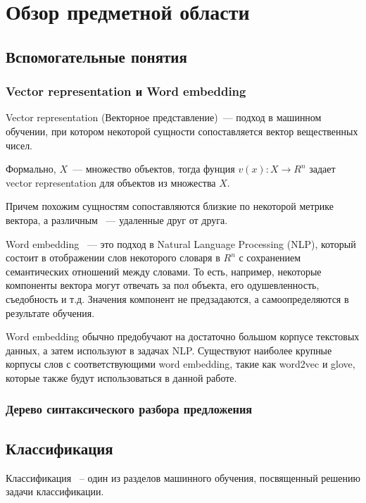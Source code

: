 
\chapter{Обзор предметной области}

\section{Вспомогательные понятия}

\subsection{Vector representation и Word embedding}
Vector representation (Векторное представление)~--- подход в машинном обучении, при котором некоторой сущности
сопоставляется вектор вещественных чисел.

Формально, $X$~--- множество объектов, тогда фунция $v(x):X \rightarrow R^n$
задает vector representation для объектов из множества $X$.

Причем похожим сущностям сопоставляются близкие
по некоторой метрике вектора, а различным ~--- удаленные друг от друга.

Word embedding ~--- это подход в Natural Language Processing (NLP), который
состоит в отображении слов некоторого словаря в $R^n$ с сохранением
семантических отношений между словами. 
То есть, например, некоторые компоненты вектора могут отвечать за пол объекта,
его одушевленность, съедобность и т.д. Значения компонент не предзадаются, а самоопределяются в результате обучения.


Word embedding обычно предобучают на достаточно большом корпусе текстовых
данных, а затем используют в задачах NLP. Существуют наиболее крупные корпусы слов с соответствующими word embedding, такие как word2vec и glove, которые также будут использоваться в данной работе.


\subsection{Дерево синтаксического разбора предложения}

\section{Классификация}

Классификация ~-- один из разделов машинного обучения, посвященный решению
задачи классификации.

